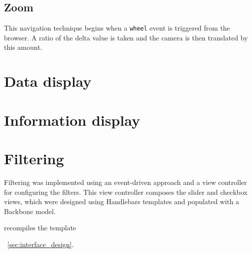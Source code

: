 {{		
	
	}

	\subsection{Zoom} {
	\label{sec:zoom}

		This navigation technique begins when a \texttt{wheel} event is triggered from the browser. A ratio of the delta value is taken and the camera is then translated by this amount.
	
	}

}

\section{Data display} {
\label{sec:data_display}



}

\section{Information display} {
\label{sec:information_display}


	

}

\section{Filtering} {
\label{sec:filtering_implementation}

	Filtering was implemented using an event-driven approach and a view controller for configuring the filters. This view controller composes the slider and checkbox views, which were designed using Handlebars templates and populated with a Backbone model.

	recompiles the template

	~\ref{sec:interface_design}.

	

	

}

